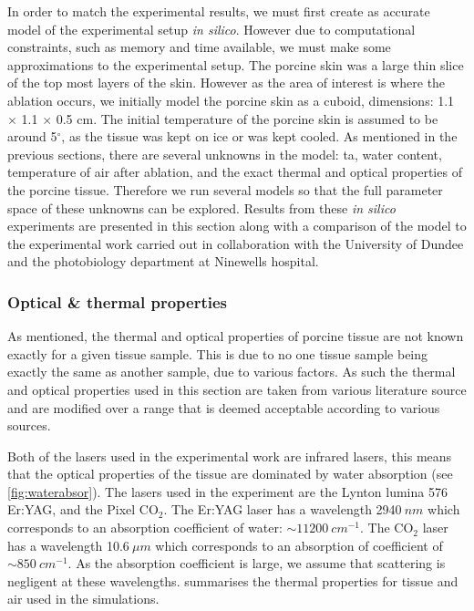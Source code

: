 In order to match the experimental results, we must first create as accurate model of the experimental setup \textit{in silico}. However due to computational constraints, such as memory and time available, we must make some approximations to the experimental setup. The porcine skin was a large thin slice of the top most layers of the skin. However as the area of interest is where the ablation occurs, we initially  model the porcine skin as a cuboid, dimensions:  1.1 $\times$ 1.1 $\times$ 0.5 cm. The initial temperature of the porcine skin is assumed to be around 5$^{\circ}$, as the tissue was kept on ice or was kept cooled. 
As mentioned in the previous sections, there are several unknowns in the model: \gls{ta}, water content, temperature of air after ablation, and the exact thermal and optical properties of the porcine tissue. Therefore we run several models so that the full parameter space of these unknowns can be explored.
Results from these \textit{in silico} experiments are presented in this section along with a comparison of the model to the experimental work carried out in collaboration with the University of Dundee and the photobiology department at Ninewells hospital.


\subsubsection{Optical \& thermal properties}

As mentioned, the thermal and optical properties of porcine tissue are not known exactly for a given tissue sample. This is due to no one tissue sample being exactly the same as another sample, due to various factors. As such the thermal and optical properties used in this section are taken from various literature source and are modified over a range that is deemed acceptable according to various sources.

Both of the lasers used in the experimental work are infrared lasers, this means that the optical properties of the tissue are dominated by water absorption (see \cref{fig:waterabsor}). The lasers used in the experiment are the Lynton lumina 576 Er:YAG, and the Pixel CO$_2$. The Er:YAG laser has a wavelength 2940$~nm$ which corresponds to an absorption coefficient of water: $\sim 11200~cm^{-1}$. The CO$_2$ laser has a wavelength 10.6$~\mu m$ which corresponds to an absorption of coefficient of $\sim 850~cm^{-1}$. As the absorption coefficient is large, we assume that scattering is negligent at these wavelengths.
 summarises the thermal properties for tissue and air used in the simulations.  

